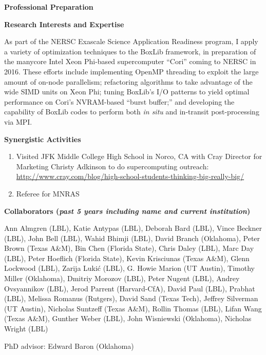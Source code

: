 \documentclass[11pt,letterpaper,english]{article}
\begin{document}
\begin{flushleft} {\bf Professional Preparation}
\begin{enumerate}
\end{enumerate} 

\vspace{-6pt}
{\bf Research Interests and Expertise}
{\parindent 16pt

As part of the NERSC Exascale Science Application Readiness program, I apply a
variety of optimization techniques to the BoxLib framework, in preparation of
the manycore Intel Xeon Phi-based supercomputer ``Cori'' coming to NERSC in
2016. These efforts include implementing OpenMP threading to exploit the large
amount of on-node parallelism; refactoring algorithms to take advantage of the
wide SIMD units on Xeon Phi; tuning BoxLib's I/O patterns to yield optimal
performance on Cori's NVRAM-based ``burst buffer;'' and developing the
capability of BoxLib codes to perform both \textit{in situ} and in-transit
post-processing via MPI.
}

\vspace{.04in}
{\bf Synergistic Activities}
\vspace{-6pt}
\begin{enumerate} \itemsep1pt \parskip0pt 

\item Visited JFK Middle College High School in Norco, CA with Cray Director
	for Marketing Christy Adkinson to do supercomputing outreach:
	\url{http://www.cray.com/blog/high-school-students-thinking-big-really-big/}

\item Referee for MNRAS
\end{enumerate} 

\vspace{-6pt}
{\bf Collaborators ({\emph{past 5 years including name and current institution}})} 
{\parindent 16pt

Ann Almgren (LBL),
Katie Antypas (LBL),
Deborah Bard (LBL),
Vince Beckner (LBL),
John Bell (LBL),
Wahid Bhimji (LBL),
David Branch (Oklahoma),
Peter Brown (Texas A\&M),
Bin Chen (Florida State),
Chris Daley (LBL),
Marc Day (LBL),
Peter Hoeflich (Florida State),
Kevin Krisciunas (Texas A\&M),
Glenn Lockwood (LBL),
Zarija Luki\'c (LBL),
G. Howie Marion (UT Austin),
Timothy Miller (Oklahoma),
Dmitriy Morozov (LBL),
Peter Nugent (LBL),
Andrey Ovsyannikov (LBL),
Jerod Parrent (Harvard-CfA),
David Paul (LBL),
Prabhat (LBL),
Melissa Romanus (Rutgers),
David Sand (Texas Tech),
Jeffrey Silverman (UT Austin),
Nicholas Suntzeff (Texas A\&M),
Rollin Thomas (LBL),
Lifan Wang (Texas A\&M),
Gunther Weber (LBL),
John Wisniewski (Oklahoma),
Nicholas Wright (LBL)

PhD advisor: Edward Baron (Oklahoma)
}


\end{flushleft}
\end{document}
